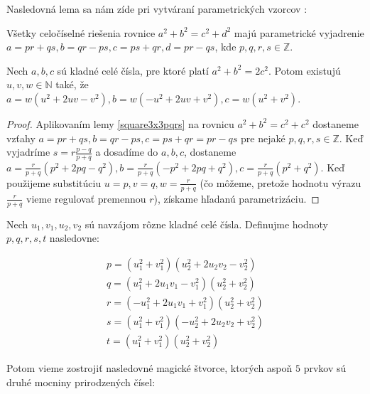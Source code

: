 Nasledovná lema sa nám zíde pri vytváraní parametrických vzorcov \cite{algebraic}:

\begin{lemma}
\label{square3x3pqrs}
Všetky celočíselné riešenia rovnice $a^2 + b^2 = c^2 + d^2$ majú parametrické vyjadrenie $a = pr + qs, b = qr - ps, c = ps + qr, d = pr - qs$, kde $p,q,r,s \in \mathbb{Z}$.
\end{lemma}

\begin{lemma} 
\label{square3x3uvw}
Nech $a,b,c$ sú kladné celé čísla, pre ktoré platí $a^2 + b^2 = 2c^2$. Potom existujú $u,v,w \in \mathbb{N}$ také, že $a = w(u^2 + 2uv - v^2), b = w(- u^2 + 2uv + v^2), c = w(u^2 + v^2)$.
\end{lemma}

\begin{proof} 
Aplikovaním lemy \ref{square3x3pqrs} na rovnicu $a^2 + b^2 = c^2 + c^2$ dostaneme vzťahy $a = pr + qs, b = qr - ps, c = ps + qr = pr - qs$ pre nejaké $p,q,r,s \in \mathbb{Z}$. Keď vyjadríme $s = r \frac{p-q}{p+q}$ a dosadíme do $a,b,c$, dostaneme $a =  \frac{r}{p+q} (p^2 + 2pq - q^2), b = \frac{r}{p+q} (-p^2 + 2pq + q^2), c = \frac{r}{p+q} (p^2 + q^2)$. Keď použijeme substitúciu $u = p, v = q, w = \frac{r}{p+q}$ (čo môžeme, pretože hodnotu výrazu $\frac{r}{p+q}$ vieme regulovať premennou $r$), získame hľadanú parametrizáciu.
\end{proof}

\begin{theorem}
\label{3x3square5squares}
Nech $u_1, v_1, u_2, v_2$ sú navzájom rôzne kladné celé čísla. Definujme hodnoty $p,q,r,s,t$ nasledovne:

\begin{gather}
p = (u_1^2 + v_1^2)(u_2^2 + 2u_2 v_2 - v_2^2) \\
q = (u_1^2 + 2u_1 v_1 - v_1^2)(u_2^2 + v_2^2) \\
r = (- u_1^2 + 2u_1 v_1 + v_1^2)(u_2^2 + v_2^2) \\
s = (u_1^2 + v_1^2)(-u_2^2 + 2u_2 v_2 + v_2^2) \\
t = (u_1^2 + v_1^2)(u_2^2 + v_2^2)
\end{gather}

Potom vieme zostrojiť nasledovné magické štvorce, ktorých aspoň $5$ prvkov sú druhé mocniny prirodzených čísel:
\end{theorem}

